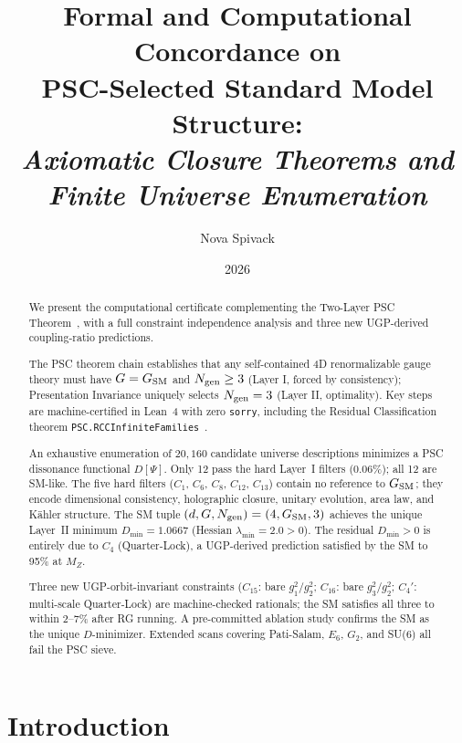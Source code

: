\documentclass[11pt,twocolumn]{article}
\title{\bfseries Formal and Computational Concordance on\\
PSC-Selected Standard Model Structure:\\
\large\itshape Axiomatic Closure Theorems and Finite Universe Enumeration}
\author{Nova Spivack}
\date{2026}
\theoremstyle{remark}
\begin{document}
\maketitle
\NovaZenodoAfterTitle

\begin{abstract}
We present the computational certificate complementing the Two-Layer PSC
Theorem~\cite{SpivackNMstar,SpivackPSCOpt}, with a full constraint independence
analysis and three new UGP-derived coupling-ratio predictions.

The PSC theorem chain establishes that any self-contained 4D renormalizable gauge theory
must have $G = G_{\rm SM}$ and $N_{\rm gen} \geq 3$ (Layer I, forced by consistency);
Presentation Invariance uniquely selects $N_{\rm gen} = 3$ (Layer II, optimality).
Key steps are machine-certified in Lean~4 with zero \texttt{sorry}, including the
Residual Classification theorem \texttt{PSC.RCCInfiniteFamilies}~\cite{ugp-lean}.

An exhaustive enumeration of $20{,}160$ candidate universe descriptions minimizes
a PSC dissonance functional $D[\Psi]$.
Only 12 pass the hard Layer~I filters (0.06\%); all 12 are SM-like.
The five hard filters ($C_1$, $C_6$, $C_8$, $C_{12}$, $C_{13}$) contain no
reference to $G_{\rm SM}$; they encode dimensional consistency, holographic
closure, unitary evolution, area law, and K\"{a}hler structure.
The SM tuple $(d,G,N_{\rm gen}) = (4,G_{\rm SM},3)$ achieves the unique
Layer~II minimum $D_{\min} = 1.0667$ (Hessian $\lambda_{\min} = 2.0 > 0$).
The residual $D_{\min} > 0$ is entirely due to $C_4$ (Quarter-Lock), a
UGP-derived prediction satisfied by the SM to 95\% at $M_Z$.

Three new UGP-orbit-invariant constraints ($C_{15}$: bare $g_1^2/g_2^2$;
$C_{16}$: bare $g_3^2/g_2^2$; $C_4'$: multi-scale Quarter-Lock) are
machine-checked rationals; the SM satisfies all three to within 2--7\% after
RG running. A pre-committed ablation study confirms the SM as the unique
$D$-minimizer. Extended scans covering Pati-Salam, $E_6$, $G_2$, and SU(6) all
fail the PSC sieve.
\end{abstract}

\tableofcontents

\section{Introduction}
\label{sec:intro}
\end{document}
